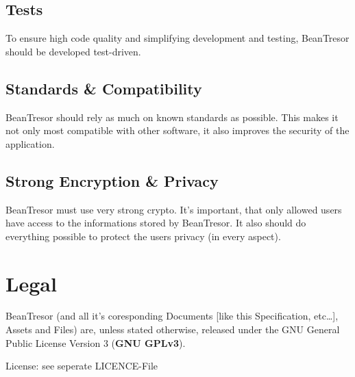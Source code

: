 \documentclass[11pt,a4paper,titlepage,portrait,english,final]{scrartcl}
\begin{document}
\subsection{Tests}
To ensure high code quality and simplifying development and testing, BeanTresor should be developed test-driven.

\subsection{Standards \& Compatibility}
BeanTresor should rely as much on known standards as possible. This makes it not only most compatible with other software, it also improves the security of the application.

\subsection{Strong Encryption \& Privacy}
BeanTresor must use very strong crypto. It's important, that only allowed users have access to the informations stored by BeanTresor. It also should do everything possible to protect the users privacy (in every aspect).

\section{Legal}
BeanTresor (and all it's coresponding Documents [like this Specification, etc\ldots], Assets and Files) are, unless stated otherwise, released under the GNU General Public License Version 3 (\textbf{GNU GPLv3}).

License:
see seperate LICENCE-File
\end{document}
